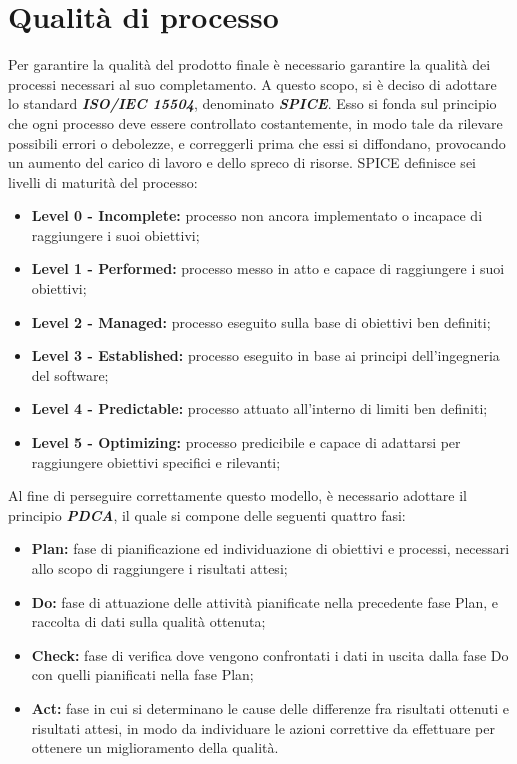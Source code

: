 \newpage
\section{Qualità di processo}

	Per garantire la qualità del prodotto finale è necessario garantire la qualità dei processi necessari al suo completamento. A questo scopo, si è deciso di adottare lo standard \textbf{\textit{ISO/IEC 15504}}, denominato \textbf{\textit{SPICE}}.
	Esso si fonda sul principio che ogni processo deve essere controllato costantemente, in modo tale da rilevare possibili errori o debolezze, e correggerli prima che essi si diffondano, provocando un aumento del carico di lavoro e dello spreco di risorse.
	SPICE definisce sei livelli di maturità del processo:
	
	\begin{itemize}
		\item \textbf{Level 0 - Incomplete:} processo non ancora implementato o incapace di raggiungere i suoi obiettivi;
		\item \textbf{Level 1 - Performed:} processo messo in atto e capace di raggiungere i suoi obiettivi;
		\item \textbf{Level 2 - Managed:} processo eseguito sulla base di obiettivi ben definiti;
		\item \textbf{Level 3 - Established:} processo eseguito in base ai principi dell’ingegneria del software; 
		\item \textbf{Level 4 - Predictable:} processo attuato all’interno di limiti ben definiti;
		\item \textbf{Level 5 - Optimizing:} processo predicibile e capace di adattarsi per raggiungere obiettivi specifici e rilevanti;
	\end{itemize}
	
	Al fine di perseguire correttamente questo modello, è necessario adottare il principio \textbf{\textit{PDCA}}, il quale si compone delle seguenti quattro fasi:
	
	\begin{itemize}
		\item \textbf{Plan:} fase di pianificazione ed individuazione di obiettivi e processi, necessari allo scopo di raggiungere i risultati attesi;
		\item \textbf{Do:} fase di attuazione delle attività pianificate nella precedente fase Plan, e raccolta di dati sulla qualità ottenuta;
		\item \textbf{Check:} fase di verifica dove vengono confrontati i dati in uscita dalla fase Do con quelli pianificati nella fase Plan;
		\item \textbf{Act:} fase in cui si determinano le cause delle differenze fra risultati ottenuti e risultati attesi, in modo da individuare le azioni correttive da effettuare per ottenere un miglioramento della qualità.
	\end{itemize}

